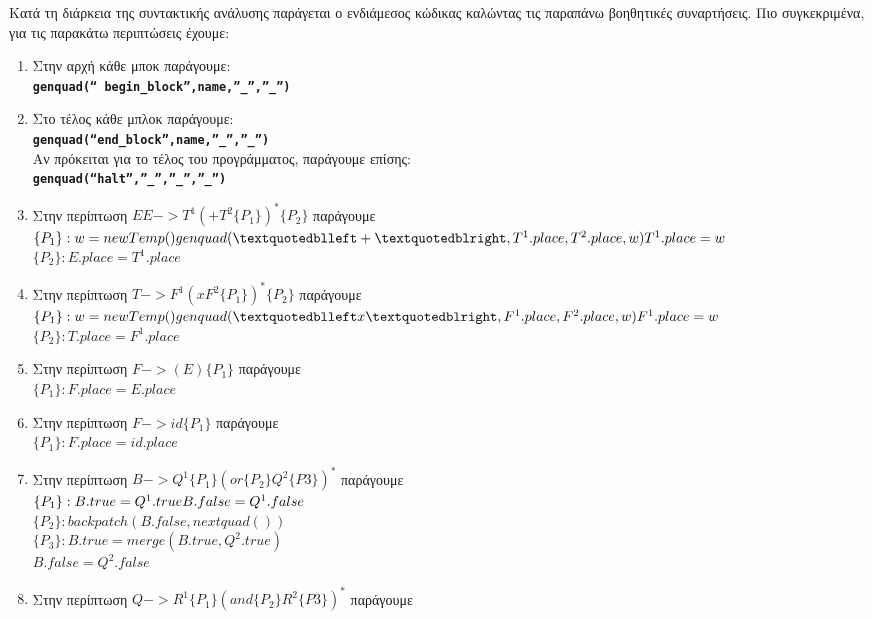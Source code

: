 \documentclass[a4paper]{article}
\let\OldTexttt\texttt
\renewcommand{\texttt}[1]{\OldTexttt{\textbf{#1}}}
\begin{document}
Κατά τη διάρκεια της συντακτικής ανάλυσης παράγεται ο ενδιάμεσος κώδικας
καλώντας τις παραπάνω βοηθητικές συναρτήσεις. Πιο συγκεκριμένα, για τις
παρακάτω περιπτώσεις έχουμε:
\begin{enumerate}
    \item Στην αρχή κάθε μποκ παράγουμε: \\ \texttt{genquad(“
        begin\_block”,name,”\_”,”\_”)} 
    \item Στο τέλος κάθε μπλοκ παράγουμε: \\
        \texttt{genquad(“end\_block”,name,”\_”,”\_”)} \\ Αν πρόκειται για
        το τέλος του προγράμματος, παράγουμε επίσης: \\
        \texttt{genquad(“halt”,”\_”,”\_”,”\_”)}
    \item Στην περίπτωση $ ΕE -> T^1(+T^2\{P_1\})^* \{P_2\}$ παράγουμε \\
        \texttt{$\{P_1\}:  w =
        newTemp()\\ genquad(“+”,T^1.place,T^2.place,w)\\T^1.place=w$ \\
        $\{P_2\}: E.place=T^1.place$} 
	\item Στην περίπτωση $ T -> F^1(xF^2\{P_1\})^* \{P_2\}$ παράγουμε \\
        \texttt{$\{P_1\}:  w =
        newTemp()\\genquad(“x”,F^1.place,F^2.place,w)\\F^1.place=w$ \\
        $\{P_2\}: T.place=F^1.place$}
	\item Στην περίπτωση $ F -> (E) \{P_1\} $ παράγουμε \\
		\texttt{$\{P_1\}: F.place=E.place$}
	\item Στην περίπτωση $ F -> id \{P_1\} $ παράγουμε \\
		\texttt{$\{P_1\}: F.place=id.place$}	
	\item Στην περίπτωση $ B -> Q^1\{P_1\}( or \{P_2\}Q^2 \{P3\})^* $ παράγουμε \\
		\texttt{$\{P_1\}: B.true=Q^1.true \\ B.false=Q^1.false$ \\ 
		$\{P_2\}: backpatch(B.false, nextquad())$ \\
		$\{P_3\}: B.true=merge(B.true, Q^2.true)$ \\ 
		$B.false= Q^2.false$}
	\item Στην περίπτωση $ Q -> R^1\{P_1\}( and \{P_2\}R^2 \{P3\})^* $ παράγουμε \\

\end{enumerate}
\end{document}
